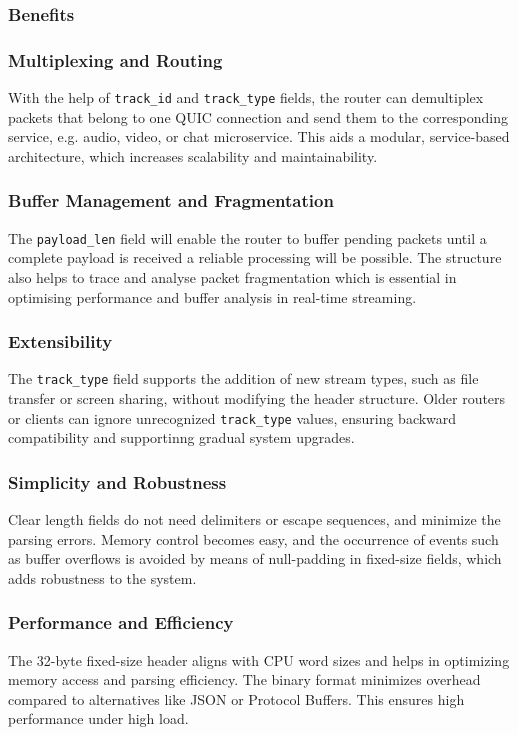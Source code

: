 \subsubsection{Benefits}

\subsubsection{Multiplexing and Routing}
With the help of \texttt{track\_id} and \texttt{track\_type} fields, the router can demultiplex packets that belong to one QUIC connection and send them to the corresponding service, e.g. audio, video, or chat microservice. This aids a modular, service-based architecture, which increases scalability and maintainability.

\subsubsection{Buffer Management and Fragmentation}
The \texttt{payload\_len} field will enable the router to buffer pending packets until a complete payload is received a reliable processing will be possible. The structure also helps to trace and analyse packet fragmentation which is essential in optimising performance and buffer analysis in real-time streaming.

\subsubsection{Extensibility}
The \texttt{track\_type} field supports the addition of new stream types, such as file transfer or screen sharing, without modifying the header structure. Older routers or clients can ignore unrecognized \texttt{track\_type} values, ensuring backward compatibility and supportinng gradual system upgrades.

\subsubsection{Simplicity and Robustness}
Clear length fields do not need delimiters or escape sequences, and minimize the parsing errors. Memory control becomes easy, and the occurrence of events such as buffer overflows is avoided by means of null-padding in fixed-size fields, which adds robustness to the system.


\subsubsection{Performance and Efficiency}
The 32-byte fixed-size header aligns with CPU word sizes and helps in optimizing memory access and parsing efficiency. The binary format minimizes overhead compared to alternatives like JSON or Protocol Buffers. This ensures high performance under high load.





